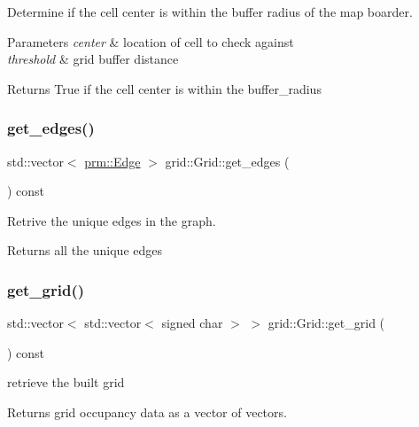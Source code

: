 Determine if the cell center is within the buffer radius of the map boarder. 


\begin{DoxyParams}{Parameters}
{\em center} & location of cell to check against \\
\hline
{\em threshold} & grid buffer distance \\
\hline
\end{DoxyParams}
\begin{DoxyReturn}{Returns}
True if the cell center is within the buffer\+\_\+radius 
\end{DoxyReturn}
\mbox{\label{classgrid_1_1Grid_a22f08e25cb643d8813fc4332300185b7}} 
\subsubsection{\texorpdfstring{get\+\_\+edges()}{get\_edges()}}
{\footnotesize\ttfamily std\+::vector$<$ \hyperlink{structprm_1_1Edge}{prm\+::\+Edge} $>$ grid\+::\+Grid\+::get\+\_\+edges (\begin{DoxyParamCaption}{ }\end{DoxyParamCaption}) const}



Retrive the unique edges in the graph. 

\begin{DoxyReturn}{Returns}
all the unique edges 
\end{DoxyReturn}
\mbox{\label{classgrid_1_1Grid_a9efaa72e19c8351e1979c6ac18517de4}} 
\subsubsection{\texorpdfstring{get\+\_\+grid()}{get\_grid()}}
{\footnotesize\ttfamily std\+::vector$<$ std\+::vector$<$ signed char $>$ $>$ grid\+::\+Grid\+::get\+\_\+grid (\begin{DoxyParamCaption}{ }\end{DoxyParamCaption}) const}



retrieve the built grid 

\begin{DoxyReturn}{Returns}
grid occupancy data as a vector of vectors. 
\end{DoxyReturn}
\mbox{\label{classgrid_1_1Grid_ab5da2712457e615bb12ca6d5fc1f1b9d}} 
